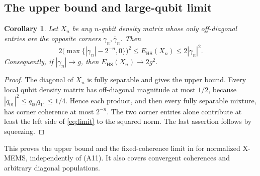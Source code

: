 \documentclass[11pt]{article}
\newtheorem{corollary}[theorem]{Corollary}
\newcommand{\E}{E_{\mathrm{HS}}}
\begin{document}
\subsection{The upper bound and large-qubit limit}
\begin{corollary}\label{cor:limit}
Let $X_n$ be any $n$-qubit density matrix whose only off-diagonal entries
are the opposite corners $\gamma_n,\bar\gamma_n$. Then
\begin{equation}\label{eq:limit}
 2\bigl(\max\{|\gamma_n|-2^{-n},0\}\bigr)^2
 \le\E(X_n)\le2|\gamma_n|^2.
\end{equation}
Consequently, if $|\gamma_n|\to g$, then $\E(X_n)\to2g^2$.
\end{corollary}
\begin{proof}
The diagonal of $X_n$ is fully separable and gives the upper bound.
Every local qubit density matrix has off-diagonal magnitude at most $1/2$,
because $|q_{01}|^2\le q_{00}q_{11}\le1/4$.
Hence each product, and then every fully separable mixture, has corner
coherence at most $2^{-n}$. The two corner entries alone contribute at least
the left side of \eqref{eq:limit} to the squared norm.
The last assertion follows by squeezing.
\end{proof}
This proves the upper bound and the fixed-coherence limit in
\cite[Eq.~(A14)]{CAW} for normalized X-MEMS, independently of (A11).
It also covers convergent coherences and arbitrary diagonal populations.
\end{document}
